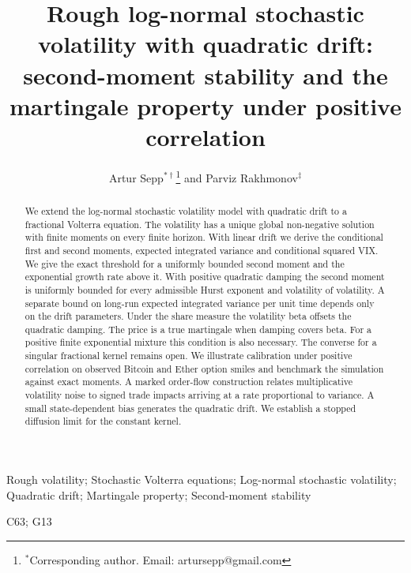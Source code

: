 \documentclass{rQUF2e}
\theoremstyle{plain}
\theoremstyle{definition}
\theoremstyle{remark}
\begin{document}
\title{Rough log-normal stochastic volatility with quadratic drift: second-moment stability and the martingale property under positive correlation}
\author{Artur Sepp$^{\ast\dag}$\thanks{$^\ast$Corresponding author. Email: artursepp@gmail.com} and Parviz Rakhmonov$^{\ddag}$\\
}
\maketitle
\thispagestyle{empty}

\begin{abstract}
We extend the log-normal stochastic volatility model with quadratic drift to a fractional Volterra equation. The volatility has a unique global non-negative solution with finite moments on every finite horizon. With linear drift we derive the conditional first and second moments, expected integrated variance and conditional squared VIX. We give the exact threshold for a uniformly bounded second moment and the exponential growth rate above it. With positive quadratic damping the second moment is uniformly bounded for every admissible Hurst exponent and volatility of volatility. A separate bound on long-run expected integrated variance per unit time depends only on the drift parameters. Under the share measure the volatility beta offsets the quadratic damping. The price is a true martingale when damping covers beta. For a positive finite exponential mixture this condition is also necessary. The converse for a singular fractional kernel remains open. We illustrate calibration under positive correlation on observed Bitcoin and Ether option smiles and benchmark the simulation against exact moments. A marked order-flow construction relates multiplicative volatility noise to signed trade impacts arriving at a rate proportional to variance. A small state-dependent bias generates the quadratic drift. We establish a stopped diffusion limit for the constant kernel.
\end{abstract}

\begin{keywords}
Rough volatility; Stochastic Volterra equations; Log-normal stochastic volatility; Quadratic drift; Martingale property; Second-moment stability
\end{keywords}
\begin{classcode}C63; G13\end{classcode}
\end{document}
